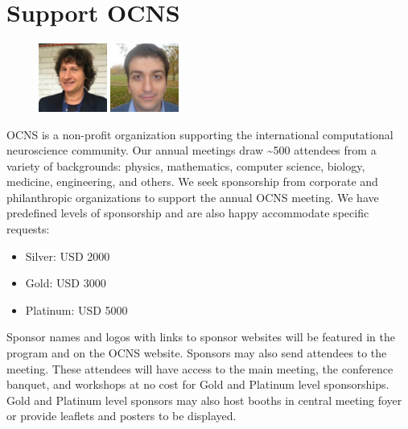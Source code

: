 \documentclass[11pt,a4paper,oneside]{article}
\begin{document}
\section*{Support OCNS}%
%
\begin{figure}
  \includegraphics[width=0.2\textwidth]{images/Garagnani}
  \includegraphics[width=0.2\textwidth]{images/Pinotsis}
\end{figure}

OCNS is a non-profit organization supporting the international computational neuroscience community.
Our annual meetings draw \textasciitilde{}500 attendees from a variety of backgrounds: physics, mathematics, computer science, biology, medicine, engineering, and others.
We seek sponsorship from corporate and philanthropic organizations to support the annual OCNS meeting.
We have predefined levels of sponsorship and are also happy accommodate specific requests:

\begin{multicols}{2}
    \begin{itemize}
      \item Silver: USD 2000
      \item Gold: USD 3000
      \item Platinum: USD 5000
    \end{itemize}
\end{multicols}

Sponsor names and logos with links to sponsor websites will be featured in the program and on the OCNS website.
Sponsors may also send attendees to the meeting.
These attendees will have access to the main meeting, the conference banquet, and workshops at no cost for Gold and Platinum level sponsorships.
Gold and Platinum level sponsors may also host booths in central meeting foyer or provide leaflets and posters to be displayed.
\end{document}
